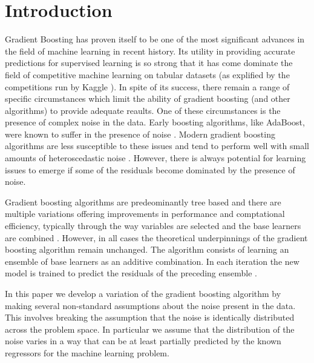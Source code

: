 \documentclass[graybox]{svmult}
\begin{document}
\section{Introduction}

Gradient Boosting has proven itself to be one of the most significant advances in
the field of machine learning in recent history. Its utility in providing accurate predictions
for supervised learning is so strong that it has come dominate the field of competitive machine 
learning on tabular datasets (as explified by the competitions run by Kaggle \cite{kaggle}).
In spite of its success, there remain a range of specific circumstances which limit the ability of
gradient boosting (and other algorithms) to provide adequate reaults. One of these
circumstances is the presence of complex noise in the data.
Early boosting algorithms, like AdaBoost, were known
to suffer in the presence of noise \cite{Freund2001,Schapire2003}. Modern gradient boosting
algorithms are less susceptible to these issues and tend to perform well with small amounts of
heteroscedastic noise \cite{brophy2022}. However, there is always potential for learning issues
to emerge if some of the residuals become dominated by the presence of noise.

Gradient boosting algorithms are predeominantly tree based and there are multiple variations 
offering improvements in performance and comptational efficiency, typically through the way variables
are selected and the base learners are combined \cite{Ke2017}.
However, in all cases the theoretical underpinnings of the gradient boosting algorithm
remain unchanged. The algorithm consists of learning an ensemble of base learners
as an additive combination. In each iteration the new model is trained to predict the
residuals of the preceding ensemble \cite{Friedman2000,Friedman2001,Friedman2002}. 

In this paper we develop a variation of the gradient boosting algorithm by making
several non-standard assumptions about the noise present in the data.
This involves breaking the assumption that the noise is identically distributed across the
problem space. In particular we assume that the distribution of the noise varies in a way that
can be at least partially predicted by the known regressors for the machine learning problem.
\end{document}
